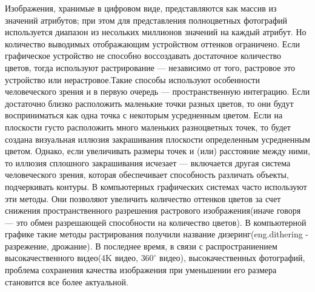 \Introduction

Изображения, хранимые в цифровом виде, представляются как массив из значений атрибутов; при этом для представления полноцветных фотографий используется диапазон из несольких миллионов значений на каждый атрибут. Но  количество выводимых отображающим устройством оттенков ограничено. Если графическое устройство не способно воссоздавать достаточное количество цветов, тогда используют растрирование — независимо от того, растровое это устройство или нерастровое.Такие способы используют особенности человеческого зрения и в первую очередь — пространственную интеграцию. Если достаточно близко расположить маленькие точки разных цветов, то они будут восприниматься как одна точка с некоторым усредненным цветом. Если на плоскости густо расположить много маленьких разноцветных точек, то будет создана визуальная иллюзия закрашивания плоскости определенным усредненным цветом. Однако, если увеличивать размеры точек и (или) расстояние между ними, то иллюзия сплошного закрашивания исчезает — включается другая система человеческого зрения, которая обеспечивает способность различать объекты, подчеркивать контуры.
В компьютерных графических системах часто используют эти методы. Они позволяют увеличить количество оттенков цветов за счет снижения пространственного разрешения растрового изображения(иначе говоря — это обмен разрешающей способности на количество цветов). В компьютерной графике такие методы растрирования получили название дизеринг(eng.dithering - разрежение, дрожание).
В последнее время, в связи с распространиением высокачественного видео(4K видео, $360^{\circ}$ видео), высокачественных фотографий,  проблема сохранения качества изображения при уменьшении его размера  становится все более актуальной.

